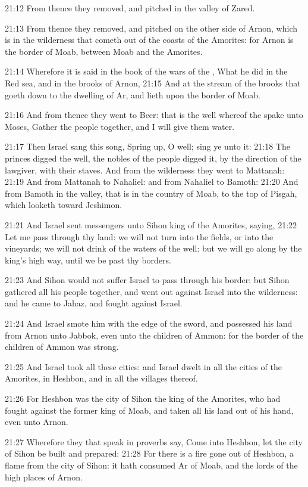 21:12 From thence they removed, and pitched in the valley of Zared.

21:13 From thence they removed, and pitched on the other side of
Arnon, which is in the wilderness that cometh out of the coasts of the
Amorites: for Arnon is the border of Moab, between Moab and the
Amorites.

21:14 Wherefore it is said in the book of the wars of the \LORD, What
he did in the Red sea, and in the brooks of Arnon, 21:15 And at the
stream of the brooks that goeth down to the dwelling of Ar, and lieth
upon the border of Moab.

21:16 And from thence they went to Beer: that is the well whereof the
\LORD spake unto Moses, Gather the people together, and I will give
them water.

21:17 Then Israel sang this song, Spring up, O well; sing ye unto it:
21:18 The princes digged the well, the nobles of the people digged it,
by the direction of the lawgiver, with their staves. And from the
wilderness they went to Mattanah: 21:19 And from Mattanah to Nahaliel:
and from Nahaliel to Bamoth: 21:20 And from Bamoth in the valley, that
is in the country of Moab, to the top of Pisgah, which looketh toward
Jeshimon.

21:21 And Israel sent messengers unto Sihon king of the Amorites,
saying, 21:22 Let me pass through thy land: we will not turn into the
fields, or into the vineyards; we will not drink of the waters of the
well: but we will go along by the king's high way, until we be past
thy borders.

21:23 And Sihon would not suffer Israel to pass through his border:
but Sihon gathered all his people together, and went out against
Israel into the wilderness: and he came to Jahaz, and fought against
Israel.

21:24 And Israel smote him with the edge of the sword, and possessed
his land from Arnon unto Jabbok, even unto the children of Ammon: for
the border of the children of Ammon was strong.

21:25 And Israel took all these cities: and Israel dwelt in all the
cities of the Amorites, in Heshbon, and in all the villages thereof.

21:26 For Heshbon was the city of Sihon the king of the Amorites, who
had fought against the former king of Moab, and taken all his land out
of his hand, even unto Arnon.

21:27 Wherefore they that speak in proverbs say, Come into Heshbon,
let the city of Sihon be built and prepared: 21:28 For there is a fire
gone out of Heshbon, a flame from the city of Sihon: it hath consumed
Ar of Moab, and the lords of the high places of Arnon.

